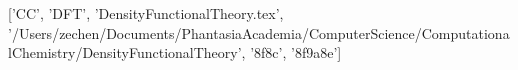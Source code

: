 ['CC', 'DFT', 'DensityFunctionalTheory.tex', '/Users/zechen/Documents/PhantasiaAcademia/ComputerScience/ComputationalChemistry/DensityFunctionalTheory', '\x8f\x8c\xae', '\xbb{}\xbd{}\x8f\x9a\x8e\xbe{}']
